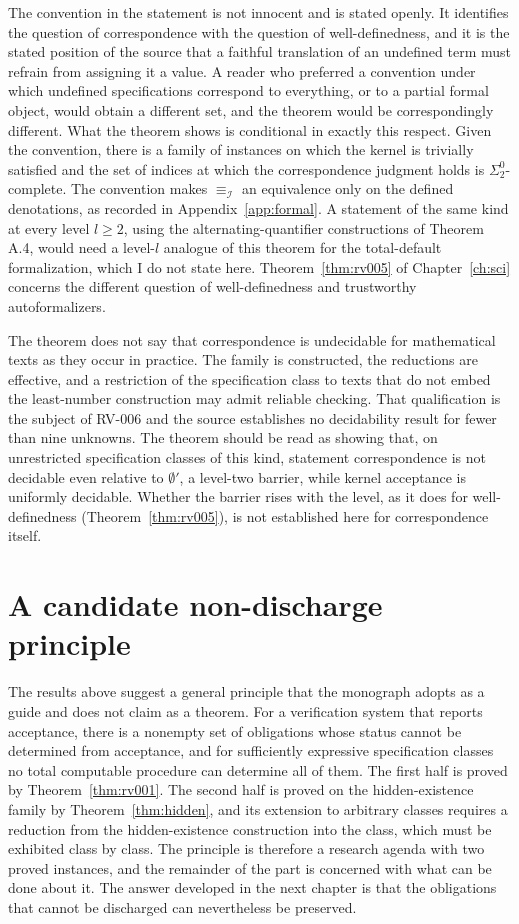 The convention in the statement is not innocent and is stated openly. It identifies the question of correspondence with the question of well-definedness, and it is the stated position of the source that a faithful translation of an undefined term must refrain from assigning it a value. A reader who preferred a convention under which undefined specifications correspond to everything, or to a partial formal object, would obtain a different set, and the theorem would be correspondingly different. What the theorem shows is conditional in exactly this respect. Given the convention, there is a family of instances on which the kernel is trivially satisfied and the set of indices at which the correspondence judgment holds is $\Sigma^0_2$-complete. The convention makes $\equiv_{\mathcal{I}}$ an equivalence only on the defined denotations, as recorded in Appendix~\ref{app:formal}. A statement of the same kind at every level $l \ge 2$, using the alternating-quantifier constructions of Theorem A.4, would need a level-$l$ analogue of this theorem for the total-default formalization, which I do not state here. Theorem~\ref{thm:rv005} of Chapter~\ref{ch:sci} concerns the different question of well-definedness and trustworthy autoformalizers.

The theorem does not say that correspondence is undecidable for mathematical texts as they occur in practice. The family is constructed, the reductions are effective, and a restriction of the specification class to texts that do not embed the least-number construction may admit reliable checking. That qualification is the subject of RV-006 and the source establishes no decidability result for fewer than nine unknowns. The theorem should be read as showing that, on unrestricted specification classes of this kind, statement correspondence is not decidable even relative to $\emptyset'$, a level-two barrier, while kernel acceptance is uniformly decidable. Whether the barrier rises with the level, as it does for well-definedness (Theorem~\ref{thm:rv005}), is not established here for correspondence itself.

\section{A candidate non-discharge principle}

The results above suggest a general principle that the monograph adopts as a guide and does not claim as a theorem. For a verification system that reports acceptance, there is a nonempty set of obligations whose status cannot be determined from acceptance, and for sufficiently expressive specification classes no total computable procedure can determine all of them. The first half is proved by Theorem~\ref{thm:rv001}. The second half is proved on the hidden-existence family by Theorem~\ref{thm:hidden}, and its extension to arbitrary classes requires a reduction from the hidden-existence construction into the class, which must be exhibited class by class. The principle is therefore a research agenda with two proved instances, and the remainder of the part is concerned with what can be done about it. The answer developed in the next chapter is that the obligations that cannot be discharged can nevertheless be preserved.
